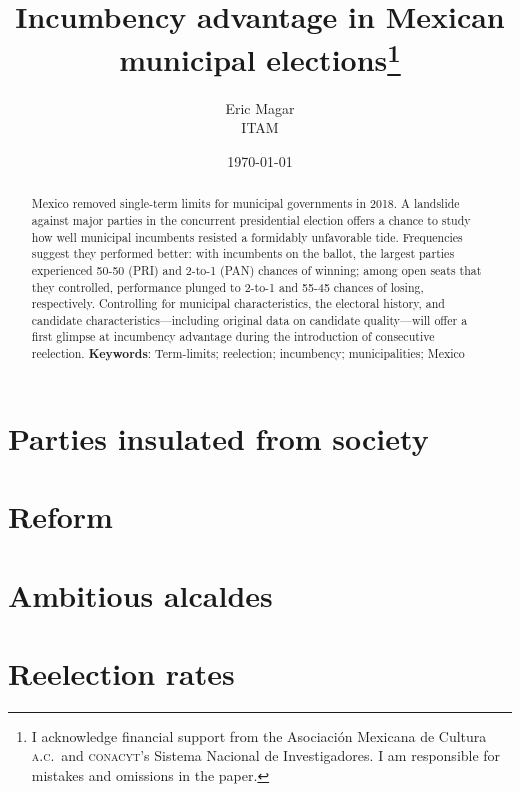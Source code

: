 \documentclass[letter,12pt]{article}
\begin{document}
\title{Incumbency advantage in Mexican municipal elections\thanks{I acknowledge financial support from the Asociaci\'on Mexicana de Cultura \textsc{a.c.}\ and \textsc{conacyt}'s Sistema Nacional de Investigadores. I am responsible for mistakes and omissions in the paper.}}
\author{Eric Magar \\ ITAM}
\date{\today}
\maketitle

\begin{abstract}
  \noindent Mexico removed single-term limits for municipal governments in 2018. A landslide against major parties in the concurrent presidential election offers a chance to study how well municipal incumbents resisted a formidably unfavorable tide. Frequencies suggest they performed better: with incumbents on the ballot, the largest parties experienced 50-50 (PRI) and 2-to-1 (PAN) chances of winning; among open seats that they controlled, performance plunged to 2-to-1 and 55-45 chances of losing, respectively. Controlling for municipal characteristics, the electoral history, and candidate characteristics---including original data on candidate quality---will offer a first glimpse at incumbency advantage during the introduction of consecutive reelection.
  \newline \newline
\textbf{Keywords}: Term-limits; reelection; incumbency; municipalities; Mexico
\end{abstract}

\section{Parties insulated from society}

\citep{magarInstReel.2017}

\citep{magar.2007ref.2015}

\citep{cain.etal.1987}

\section{Reform}

\section{Ambitious alcaldes}

\section{Reelection rates}
\end{document}
